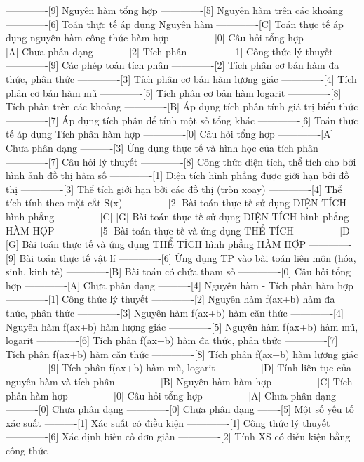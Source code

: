 -------------[9] Nguyên hàm tổng hợp
-------------[5] Nguyên hàm trên các khoảng
-------------[6] Toán thực tế áp dụng Nguyên hàm
-------------[C] Toán thực tế áp dụng nguyên hàm công thức hàm hợp
-------------[0] Câu hỏi tổng hợp
-------------[A] Chưa phân dạng
----------[2] Tích phân
-------------[1] Công thức lý thuyết
-------------[9] Các phép toán tích phân
-------------[2] Tích phân cơ bản hàm đa thức, phân thức
-------------[3] Tích phân cơ bản hàm lượng giác
-------------[4] Tích phân cơ bản hàm mũ
-------------[5] Tích phân cơ bản hàm logarit
-------------[8] Tích phân trên các khoảng
-------------[B] Áp dụng tích phân tính giá trị biểu thức 
-------------[7] Áp dụng tích phân để tính một số tổng khác
-------------[6] Toán thực tế áp dụng Tích phân hàm hợp
-------------[0] Câu hỏi tổng hợp
-------------[A] Chưa phân dạng
----------[3] Ứng dụng thực tế và hình học của tích phân
-------------[7] Câu hỏi lý thuyết
-------------[8] Công thức diện tích, thể tích cho bởi hình ảnh đồ thị hàm số
-------------[1] Diện tích hình phẳng được giới hạn bởi đồ thị
-------------[3] Thể tích giới hạn bởi các đồ thị (tròn xoay)
-------------[4] Thể tích tính theo mặt cắt S(x)
-------------[2] Bài toán thực tế sử dụng DIỆN TÍCH hình phẳng
-------------[C] [G] Bài toán thực tế sử dụng DIỆN TÍCH hình phẳng HÀM HỢP
-------------[5] Bài toán thực tế và ứng dụng THỂ TÍCH
-------------[D] [G] Bài toán thực tế và ứng dụng THỂ TÍCH hình phẳng HÀM HỢP
-------------[9] Bài toán thực tế vật lí
-------------[6] Ứng dụng TP vào bài toán liên môn (hóa, sinh, kinh tế)
-------------[B] Bài toán có chứa tham số
-------------[0] Câu hỏi tổng hợp
-------------[A] Chưa phân dạng
----------[4] Nguyên hàm - Tích phân hàm hợp
-------------[1] Công thức lý thuyết
-------------[2] Nguyên hàm f(ax+b) hàm đa thức, phân thức
-------------[3] Nguyên hàm f(ax+b) hàm căn thức
-------------[4] Nguyên hàm f(ax+b) hàm lượng giác
-------------[5] Nguyên hàm f(ax+b) hàm mũ, logarit
-------------[6] Tích phân f(ax+b) hàm đa thức, phân thức
-------------[7] Tích phân f(ax+b) hàm căn thức
-------------[8] Tích phân f(ax+b) hàm lượng giác
-------------[9] Tích phân f(ax+b) hàm mũ, logarit
-------------[D] Tính liên tục của nguyên hàm và tích phân
-------------[B] Nguyên hàm hàm hợp
-------------[C] Tích phân hàm hợp
-------------[0] Câu hỏi tổng hợp
-------------[A] Chưa phân dạng
----------[0] Chưa phân dạng
-------------[0] Chưa phân dạng
-------[5] Một số yếu tố xác suất
----------[1] Xác suất có điều kiện
-------------[1] Công thức lý thuyết
-------------[6] Xác định biến cố đơn giản
-------------[2] Tính XS có điều kiện bằng công thức
